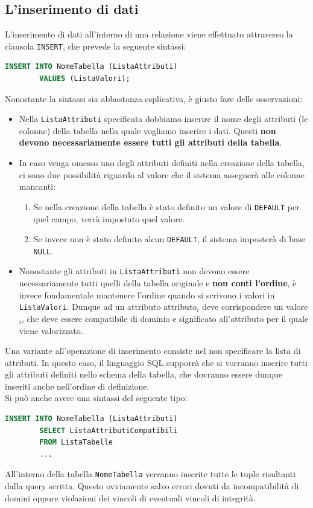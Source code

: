 \documentclass[12pt]{report}
\begin{document}
	\subsection{L'inserimento di dati}
	L'inserimento di dati all'interno di una relazione viene effettuato attraverso la clausola \texttt{INSERT}, che prevede la seguente sintassi:
	\begin{lstlisting}[language=SQL]
		INSERT INTO NomeTabella (ListaAttributi)
		VALUES (ListaValori);
	\end{lstlisting}
	Nonostante la sintassi sia abbastanza esplicativa, è giusto fare delle osservazioni:
	\begin{itemize}
		\item Nella \texttt{ListaAttributi} specificata dobbiamo inserire il nome degli attributi (le colonne) della tabella nella quale vogliamo inserire i dati. Questi \textbf{non devono necessariamente essere tutti gli attributi della tabella}.
		
		\item In caso venga omesso uno degli attributi definiti nella creazione della tabella, ci sono due possibilità riguardo al valore che il sistema assegnerà alle colonne mancanti:
		\begin{enumerate}
			\item Se nella creazione della tabella è stato definito un valore di \texttt{DEFAULT} per quel campo, verrà impostato quel valore.
			
			\item Se invece non è stato definito alcun \texttt{DEFAULT}, il sistema imposterà di base \texttt{NULL}.
		\end{enumerate}
		
		\item Nonostante gli attributi in \texttt{ListaAttributi} non devono essere necessariamente tutti quelli della tabella originale e \textbf{non conti l'ordine}, è invece fondamentale mantenere l'ordine quando si scrivono i valori in \texttt{ListaValori}. Dunque ad un attributo attributo$_i$ deve corrispondere un valore$_i$, che deve essere compatibile di dominio e significato all'attributo per il quale viene valorizzato.
	\end{itemize}
	
	Una variante all'operazione di inserimento consiste nel non specificare la lista di attributi. In questo caso, il linguaggio SQL supporrà che si vorranno inserire tutti gli attributi definiti nello schema della tabella, che dovranno essere dunque inseriti anche nell'ordine di definizione.\\
	Si può anche avere una sintassi del seguente tipo:
	\begin{lstlisting}[language=SQL]
		INSERT INTO NomeTabella (ListaAttributi)
		SELECT ListaAttributiCompatibili
		FROM ListaTabelle
		...
	\end{lstlisting}
	All'interno della tabella \texttt{NomeTabella} verranno inserite tutte le tuple risultanti dalla query scritta. Questo ovviamente salvo errori dovuti da incompatibilità di domini oppure violazioni dei vincoli di eventuali vincoli di integrità.
	
\end{document}
